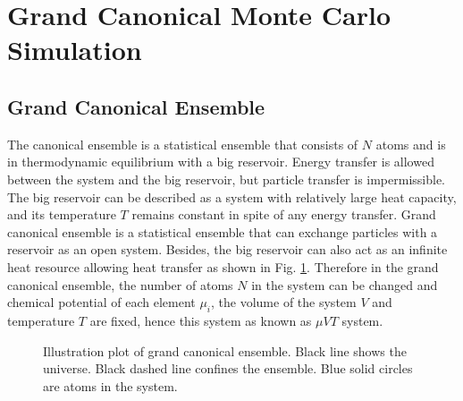 \section{Grand Canonical Monte Carlo Simulation}
\label{Chap:Mech:GCMC}

\subsection{Grand Canonical Ensemble}

The canonical ensemble is a statistical ensemble that consists of $N$ atoms and is in thermodynamic equilibrium with a big reservoir. Energy transfer is allowed between the system and the big reservoir, but particle transfer is impermissible. The big reservoir can be described as a system with relatively large heat capacity, and its temperature $T$ remains constant in spite of any energy transfer. Grand canonical ensemble is a statistical ensemble that can exchange particles with a reservoir as an open system. Besides, the big reservoir can also act as an infinite heat resource allowing heat transfer as shown in Fig. \ref{Chap:Meth:GCMC:fig1}. \cite{frenkel2001understanding} Therefore in the grand canonical ensemble, the number of atoms $N$ in the system can be changed and chemical potential of each element $\mu_i$, the volume of the system $V$ and temperature $T$ are fixed, hence this system as known as $\mu VT$ system.

\begingroup
\begin{figure}[!ht]
  \centering
  \caption[Illustration plot of grand canonical ensemble]{Illustration plot of grand canonical ensemble. Black line shows the universe. Black dashed line confines the ensemble. Blue solid circles are atoms in the system.}
  \label{Chap:Meth:GCMC:fig1}
\end{figure}
\endgroup

